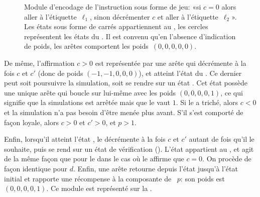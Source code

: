 \begin{figure}[ht]
\centering
{}
\caption[Module d'encodage de l'instruction \tjztest sous forme de jeu]{Module d'encodage de l'instruction \tjztest sous forme de jeu: «si $c=0$ alors aller à l'étiquette~$\ell_1$, sinon décrémenter $c$ et aller à l'étiquette~$\ell_2$». Les états sous forme de carrés appartiennent au \jo, les cercles représentent les états du \ji. Il est convenu qu'en l'absence d'indication de poids, les arêtes comportent les poids~$(0,0,0,0,0)$.}%
\label{tj:fig:zerotest}
\end{figure}

De même, l'affirmation $c>0$ est représentée par une arête qui décrémente à la fois $c$ et $c'$ (donc de poids $(-1,-1,0,0,0)$), et atteint l'état du \ji.
Ce dernier peut soit poursuivre la simulation, soit se rendre sur un état \tjstopq.
Cet état possède une unique arête qui boucle sur lui-même avec les poids $(0,0,0,0,1)$, ce qui signifie que la simulations est arrêtée mais que le  vaut $1$.
Si le \jo a triché, alors $c<0$ et la simulation n'a pas besoin d'être menée plus avant.
S'il s'est comporté de façon loyale, alors $c>0$ et $c'>0$, et $p>1$.

Enfin, lorsqu'il atteint l'état \tjhalt, le \jo décrémente à la fois $c$ et $c'$ autant de fois qu'il le souhaite, puis se rend sur un état de vérification (\tjcheck).
L'état \tjcheck appartient au \ji, et agit de la même façon que pour le \tjztest dans le cas où le \jo affirme que $c=0$.
On procède de façon identique pour $d$.
Enfin, une arête retourne depuis l'état \tjcheck jusqu'à l'état initial et rapporte une récompense à la composante de ~$p$: son poids est $(0,0,0,0,1)$.
Ce module est représenté sur la .

